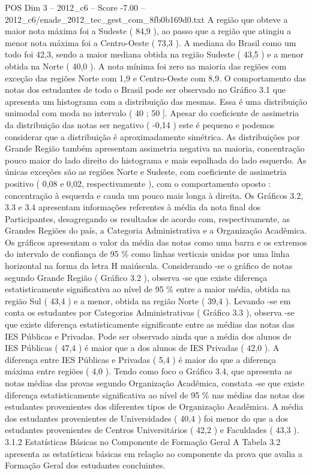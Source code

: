 \begin{textsample}{POS Dim 3 – 2012\_c6 – Score -7.00 – 2012\_c6/enade\_2012\_tec\_gest\_com\_8fb0b169d0.txt}
A região que obteve a maior nota máxima foi a Sudeste ( 84,9 ), ao passo que a região que atingiu a menor nota máxima foi a Centro-Oeste ( 73,3 ).
A mediana do Brasil como um todo foi 42,3, sendo a maior mediana obtida na região Sudeste ( 43,5 ) e a menor obtida na Norte ( 40,0 ).
A nota mínima foi zero na maioria das regiões com exceção das regiões Norte com 1,9 e Centro-Oeste com 8,9.
O comportamento das notas dos estudantes de todo o Brasil pode ser observado no Gráfico 3.1 que apresenta um histograma com a distribuição das mesmas.
Essa é uma distribuição unimodal com moda no intervalo ( 40 ; 50 ].
Apesar do coeficiente de assimetria da distribuição das notas ser negativo ( -0,14 ) este é pequeno e podemos considerar que a distribuição é aproximadamente simétrica.
As distribuições por Grande Região também apresentam assimetria negativa na maioria, concentração pouco maior do lado direito do histograma e mais espalhada do lado esquerdo.
As únicas exceções são as regiões Norte e Sudeste, com coeficiente de assimetria positivo ( 0,08 e 0,02, respectivamente ), com o comportamento oposto : concentração à esquerda e cauda um pouco mais longa à direita.
Os Gráficos 3.2, 3.3 e 3.4 apresentam informações referentes à média da nota final dos Participantes, desagregando os resultados de acordo com, respectivamente, as Grandes Regiões do país, a Categoria Administrativa e a Organização Acadêmica.
Os gráficos apresentam o valor da média das notas como uma barra e os extremos do intervalo de confiança de 95 \% como linhas verticais unidas por uma linha horizontal na forma da letra H maiúscula.
Considerando -se o gráfico de notas segundo Grande Região ( Gráfico 3.2 ), observa -se que existe diferença estatisticamente significativa ao nível de 95 \% entre a maior média, obtida na região Sul ( 43,4 ) e a menor, obtida na região Norte ( 39,4 ).
Levando -se em conta os estudantes por Categorias Administrativas ( Gráfico 3.3 ), observa -se que existe diferença estatisticamente significante entre as médias das notas das IES Públicas e Privadas.
Pode ser observado ainda que a média dos alunos de IES Públicas ( 47,4 ) é maior que a dos alunos de IES Privadas ( 42,0 ).
A diferença entre IES Públicas e Privadas ( 5,4 ) é maior do que a diferença máxima entre regiões ( 4,0 ).
Tendo como foco o Gráfico 3.4, que apresenta as notas médias das provas segundo Organização Acadêmica, constata -se que existe diferença estatisticamente significativa ao nível de 95 \% nas médias das notas dos estudantes provenientes dos diferentes tipos de Organização Acadêmica.
A média dos estudantes provenientes de Universidades ( 40,4 ) foi menor do que a dos estudantes provenientes de Centros Universitários ( 42,2 ) e Faculdades ( 43,3 ). 3.1.2 Estatísticas Básicas no Componente de Formação Geral A Tabela 3.2 apresenta as estatísticas básicas em relação ao componente da prova que avalia a Formação Geral dos estudantes concluintes.

\end{textsample}
